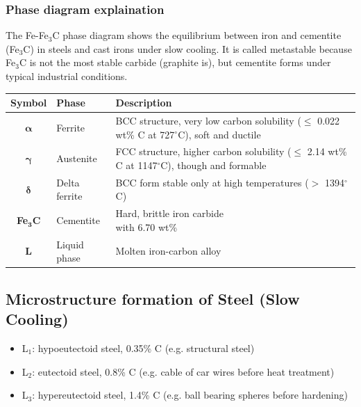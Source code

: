\documentclass{article}
\begin{document}
\subsubsection{Phase diagram explaination}
The Fe-Fe$_3$C phase diagram shows the equilibrium between iron and cementite (Fe$_3$C) in
steels and cast irons under slow cooling. It is called metastable because Fe$_3$C is not the
most stable carbide (graphite is), but cementite forms under typical industrial conditions.

{
  \renewcommand{\arraystretch}{2}
  \begin{table}[ht!]
    \centering
    \begin{tabular}{|c|l|l|}
      \hline \textbf{Symbol} & \textbf{Phase} & \textbf{Description}\\
      \hline $\bm{\alpha}$ & Ferrite & \makecell[l]{BCC structure, very low carbon solubility\\($\leq$ 0.022 wt\% C at 727$^\circ$C), soft and ductile}\\
      \hline $\bm{\gamma}$ & Austenite & \makecell[l]{FCC structure, higher carbon solubility\\($\leq$ 2.14 wt\% C at 1147$^\circ$C), though and formable}\\
      \hline $\bm{\delta}$ & Delta ferrite & \makecell[l]{BCC form stable only\\at high temperatures ($>$ 1394$^\circ$C)}\\
      \hline \textbf{Fe$_{\mathbf{3}}$C} & Cementite & \makecell[l]{Hard, brittle iron carbide\\with 6.70 wt\%}\\
      \hline \textbf{L} & Liquid phase & Molten iron-carbon alloy\\
      \hline 
    \end{tabular}
  \end{table}
}

\newpage
\subsection{Microstructure formation of Steel (Slow Cooling)}
\begin{itemize}
  \item L$_1$: hypoeutectoid steel, 0.35\% C (e.g. structural steel)
  \item L$_2$: eutectoid steel, 0.8\% C (e.g. cable of car wires before heat treatment)
  \item L$_3$: hypereutectoid steel, 1.4\% C (e.g. ball bearing spheres before hardening)
\end{itemize}
\end{document}

